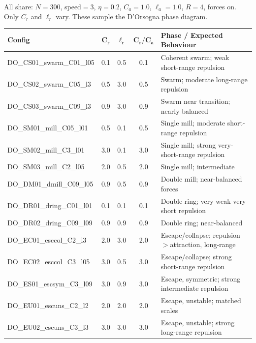 \documentclass[10pt,landscape]{article}
\begin{document}
All share: $N{=}300$, speed$=3$, $\eta{=}0.2$, $C_a{=}1.0$, $\ell_a{=}1.0$, $R{=}4$, forces on.
Only $C_r$ and $\ell_r$ vary.  These sample the D'Orsogna phase diagram.

\begin{center}
\small
\begin{tabular}{l c c c l}
\toprule
\textbf{Config} & $\boldsymbol{C_r}$ & $\boldsymbol{\ell_r}$ & $\boldsymbol{C_r / C_a}$ & \textbf{Phase / Expected Behaviour} \\
\midrule
\rowcolor{rowA}
DO\_CS01\_swarm\_C01\_l05   & 0.1  & 0.5  & 0.1 & Coherent swarm; weak short-range repulsion \\
DO\_CS02\_swarm\_C05\_l3    & 0.5  & 3.0  & 0.5 & Swarm; moderate long-range repulsion \\
\rowcolor{rowA}
DO\_CS03\_swarm\_C09\_l3    & 0.9  & 3.0  & 0.9 & Swarm near transition; nearly balanced \\
\midrule
DO\_SM01\_mill\_C05\_l01    & 0.5  & 0.1  & 0.5 & Single mill; moderate short-range repulsion \\
\rowcolor{rowA}
DO\_SM02\_mill\_C3\_l01     & 3.0  & 0.1  & 3.0 & Single mill; strong very-short-range repulsion \\
DO\_SM03\_mill\_C2\_l05     & 2.0  & 0.5  & 2.0 & Single mill; intermediate \\
\midrule
\rowcolor{rowA}
DO\_DM01\_dmill\_C09\_l05   & 0.9  & 0.5  & 0.9 & Double mill; near-balanced forces \\
\midrule
DO\_DR01\_dring\_C01\_l01   & 0.1  & 0.1  & 0.1 & Double ring; very weak very-short repulsion \\
\rowcolor{rowA}
DO\_DR02\_dring\_C09\_l09   & 0.9  & 0.9  & 0.9 & Double ring; near-balanced \\
\midrule
DO\_EC01\_esccol\_C2\_l3    & 2.0  & 3.0  & 2.0 & Escape/collapse; repulsion$>$attraction, long-range \\
\rowcolor{rowA}
DO\_EC02\_esccol\_C3\_l05   & 3.0  & 0.5  & 3.0 & Escape/collapse; strong short-range repulsion \\
\midrule
DO\_ES01\_escsym\_C3\_l09   & 3.0  & 0.9  & 3.0 & Escape, symmetric; strong intermediate repulsion \\
\midrule
\rowcolor{rowA}
DO\_EU01\_escuns\_C2\_l2    & 2.0  & 2.0  & 2.0 & Escape, unstable; matched scales \\
DO\_EU02\_escuns\_C3\_l3    & 3.0  & 3.0  & 3.0 & Escape, unstable; strong long-range repulsion \\
\bottomrule
\end{tabular}
\end{center}
\end{document}
